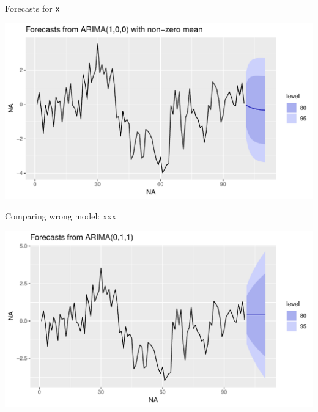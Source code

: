 \documentclass[ignorenonframetext,]{beamer}
\newenvironment{Shaded}{\begin{snugshade}}{\end{snugshade}}
\newcommand{\KeywordTok}[1]{\textcolor[rgb]{0.13,0.29,0.53}{\textbf{#1}}}
\newcommand{\NormalTok}[1]{#1}
\newcommand{\OperatorTok}[1]{\textcolor[rgb]{0.81,0.36,0.00}{\textbf{#1}}}
\newcommand{\StringTok}[1]{\textcolor[rgb]{0.31,0.60,0.02}{#1}}
\begin{document}
\begin{frame}[fragile]{Forecasts for \texttt{x}}
\protect\hypertarget{forecasts-for-x}{}

\begin{Shaded}
\end{Shaded}

\includegraphics{figure/unnamed-chunk-56-1.pdf}

\end{frame}

\begin{frame}[fragile]{Comparing wrong model: xxx}
\protect\hypertarget{comparing-wrong-model-xxx}{}

\begin{Shaded}
\end{Shaded}

\includegraphics{figure/unnamed-chunk-57-1.pdf}

\end{frame}
\end{document}
